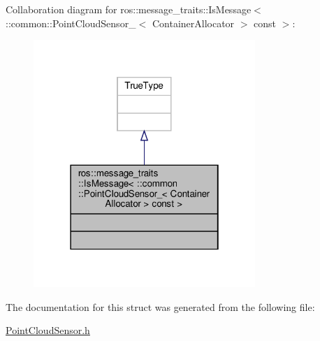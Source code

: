 Collaboration diagram for ros\+:\+:message\+\_\+traits\+:\+:Is\+Message$<$ \+:\+:common\+:\+:Point\+Cloud\+Sensor\+\_\+$<$ Container\+Allocator $>$ const $>$\+:\nopagebreak
\begin{figure}[H]
\begin{center}
\leavevmode
\includegraphics[width=238pt]{db/dba/structros_1_1message__traits_1_1IsMessage_3_01_1_1common_1_1PointCloudSensor___3_01ContainerAllo733dba2c995b0cb4b528a25bb3e403b0}
\end{center}
\end{figure}


The documentation for this struct was generated from the following file\+:\begin{DoxyCompactItemize}
\item 
\hyperlink{PointCloudSensor_8h}{Point\+Cloud\+Sensor.\+h}\end{DoxyCompactItemize}
